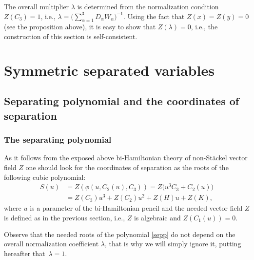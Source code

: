 \documentclass[pdftex]{sigma}
\def\a{\alpha}
\def\l{\lambda}
\numberwithin{equation}{section}
\begin{document}
\begin{Remark}
The overall multiplier $\l$ is determined from the normalization condition $Z(C_3)=1$, i.e., $\l=\bigl(\sum_{\a=1}^3 D_{\a} W_{\a})^{-1}$. Using the fact that $Z(x)=Z(y)=0$ (see the proposition above), it is easy to show that $Z(\l)=0$, i.e., the construction of this section is self-consistent.
\end{Remark}
\section{Symmetric separated variables}\label{sec5}
\subsection{Separating polynomial and the coordinates of separation}
\subsubsection{The separating polynomial}
As it follows from the exposed above bi-Hamiltonian theory of non-St\"ackel vector field $Z$ one should look for the coordinates of separation as the roots of the following cubic polynomial:
\begin{align}
S(u)&= Z(\phi(u,C_2(u),C_3))= Z\big(u^3 C_3+C_2(u)\big)\nonumber\\
&= Z(C_3) u^3+ Z(C_2) u^2+ Z(H) u +Z(K),\label{sepp}
\end{align}
where $u$ is a parameter of the bi-Hamiltonian pencil and the needed vector field $Z$ is defined as in the previous section, i.e., $Z$ is algebraic and $Z(C_1(u))=0$.


\begin{Remark}
 Observe that the needed roots of the polynomial \eqref{sepp} do not depend on the overall normalization coefficient $\l$, that is why we will simply ignore it, putting hereafter that~${\l=1}$.
 \end{Remark}
\end{document}
